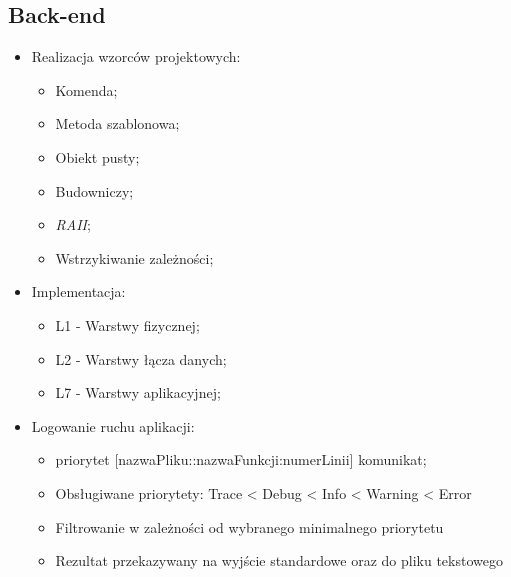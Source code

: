 	\subsection{Back-end}
	\begin{itemize}
		\item Realizacja wzorców projektowych:
		\begin{itemize}
			\item Komenda;
			\item Metoda szablonowa;
			\item Obiekt pusty;
			\item Budowniczy;
			\item \textit{RAII};
			\item Wstrzykiwanie zależności;
		\end{itemize}
		\item Implementacja:
		\begin{itemize}
			\item L1 - Warstwy fizycznej;
			\item L2 - Warstwy łącza danych;
			\item L7 - Warstwy aplikacyjnej;
		\end{itemize}
		\item Logowanie ruchu aplikacji:
		\begin{itemize}
			\item <h:min::s::ms> priorytet [nazwaPliku::nazwaFunkcji:numerLinii] komunikat;
			\item Obsługiwane priorytety: Trace < Debug < Info <  Warning < Error
			\item Filtrowanie w zależności od wybranego minimalnego priorytetu
			\item Rezultat przekazywany na wyjście standardowe oraz do pliku tekstowego
		\end{itemize}
	\end{itemize}
